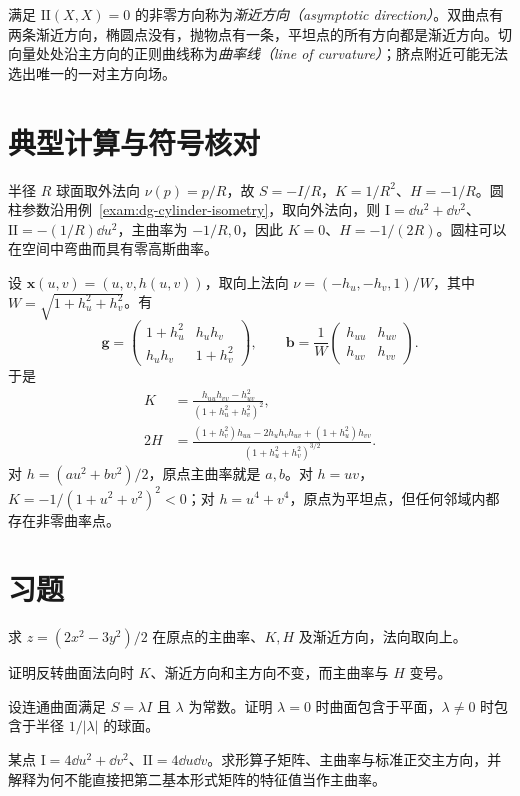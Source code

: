 满足 $\mathrm{II}(X,X)=0$ 的非零方向称为\emph{渐近方向（asymptotic direction）}。双曲点有两条渐近方向，椭圆点没有，抛物点有一条，平坦点的所有方向都是渐近方向。切向量处处沿主方向的正则曲线称为\emph{曲率线（line of curvature）}；脐点附近可能无法选出唯一的一对主方向场。

\section{典型计算与符号核对}
\begin{example}[球面与圆柱]
半径 $R$ 球面取外法向 $\nu(p)=p/R$，故 $S=-I/R$，$K=1/R^2$、$H=-1/R$。圆柱参数沿用例~\ref{exam:dg-cylinder-isometry}，取向外法向，则 $\mathrm I=\dd u^2+\dd v^2$、$\mathrm{II}=-(1/R)\dd u^2$，主曲率为 $-1/R,0$，因此 $K=0$、$H=-1/(2R)$。圆柱可以在空间中弯曲而具有零高斯曲率。
\end{example}

\begin{example}[图像的曲率公式]\label{exam:dg-graph-curvature}
设 $\mathbf x(u,v)=(u,v,h(u,v))$，取向上法向 $\nu=(-h_u,-h_v,1)/W$，其中 $W=\sqrt{1+h_u^2+h_v^2}$。有
\[
 \mathbf g=\begin{pmatrix}1+h_u^2&h_uh_v\\h_uh_v&1+h_v^2\end{pmatrix},\qquad
 \mathbf b=\frac1W\begin{pmatrix}h_{uu}&h_{uv}\\h_{uv}&h_{vv}\end{pmatrix}.
\]
于是
\begin{align}
 K&=\frac{h_{uu}h_{vv}-h_{uv}^2}{(1+h_u^2+h_v^2)^2},\label{eq:dg-graph-K}\\
 2H&=\frac{(1+h_v^2)h_{uu}-2h_uh_vh_{uv}+(1+h_u^2)h_{vv}}
 {(1+h_u^2+h_v^2)^{3/2}}.\label{eq:dg-graph-H}
\end{align}
对 $h=(au^2+bv^2)/2$，原点主曲率就是 $a,b$。对 $h=uv$，$K=-1/(1+u^2+v^2)^2<0$；对 $h=u^4+v^4$，原点为平坦点，但任何邻域内都存在非零曲率点。
\end{example}

\section{习题}
\begin{exercise}\label{ex:dg-curvature-quadric}
求 $z=(2x^2-3y^2)/2$ 在原点的主曲率、$K,H$ 及渐近方向，法向取向上。
\end{exercise}
\begin{exercise}\label{ex:dg-curvature-normal}
证明反转曲面法向时 $K$、渐近方向和主方向不变，而主曲率与 $H$ 变号。
\end{exercise}
\begin{exercise}\label{ex:dg-curvature-umbilic}
设连通曲面满足 $S=\lambda I$ 且 $\lambda$ 为常数。证明 $\lambda=0$ 时曲面包含于平面，$\lambda\ne0$ 时包含于半径 $1/|\lambda|$ 的球面。
\end{exercise}
\begin{exercise}\label{ex:dg-curvature-matrices}
某点 $\mathrm I=4\dd u^2+\dd v^2$、$\mathrm{II}=4\dd u\dd v$。求形算子矩阵、主曲率与标准正交主方向，并解释为何不能直接把第二基本形式矩阵的特征值当作主曲率。
\end{exercise}

